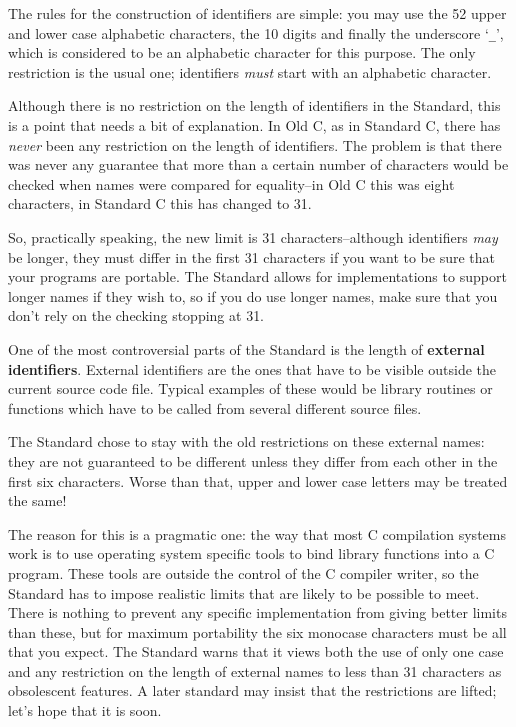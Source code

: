    The rules for the construction of identifiers are simple: you may use
    the 52 upper and lower case alphabetic characters, the 10 digits and
    finally the underscore `\texttt{\_}', which is considered to be
    an alphabetic character for this purpose. The only restriction is the
    usual one; identifiers \textit{must} start with an alphabetic
    character.


   Although there is no restriction on the length of identifiers in the
    Standard, this is a point that needs a bit of explanation. In Old C,
    as in Standard C, there has \textit{never} been any restriction on
    the length of identifiers. The problem is that there was never any
    guarantee that more than a certain number of characters would be checked
    when names were compared for equality--in Old C this was eight
    characters, in Standard C this has changed to 31.


   So, practically speaking, the new limit is
    31 characters--although identifiers \textit{may} be longer, they
    must differ in the first 31 characters if you want to be sure that
    your programs are portable. The Standard allows for implementations to
    support longer names if they wish to, so if you do use longer names, make
    sure that you don't rely on the checking stopping at 31.


   One of the most controversial parts of the Standard is the length of
    \textbf{external identifiers}. External identifiers are the ones that
    have to be visible outside the current source code file. Typical examples
    of these would be library routines or functions which have to be called
    from several different source files.


   The Standard chose to stay with the old restrictions on these external
    names: they are not guaranteed to be different unless they differ from
    each other in the first six characters. Worse than that, upper and lower
    case letters may be treated the same!


   The reason for this is a pragmatic one: the way that most
    C compilation systems work is to use operating system specific tools
    to bind library functions into a C program. These tools are outside
    the control of the C compiler writer, so the Standard has to impose
    realistic limits that are likely to be possible to meet. There is nothing
    to prevent any specific implementation from giving better limits than
    these, but for maximum portability the six monocase characters must be
    all that you expect. The Standard warns that it views both the use of
    only one case and any restriction on the length of external names to less
    than 31 characters as obsolescent features. A later standard may
    insist that the restrictions are lifted; let's hope that it is soon.


